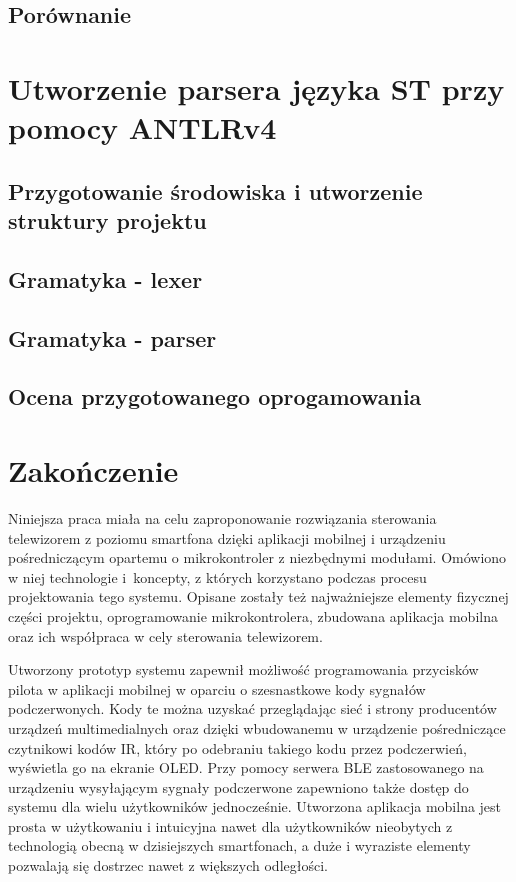 \documentclass[12pt,twoside]{article}
\begin{document}
\subsection{Porównanie}
\clearpage
\section{Utworzenie parsera języka ST przy pomocy ANTLRv4}
\subsection{Przygotowanie środowiska i utworzenie struktury projektu}
\subsection{Gramatyka - lexer}
\subsection{Gramatyka - parser}
\subsection{Ocena przygotowanego oprogamowania}
\clearpage

\section{Zakończenie}

Niniejsza praca miała na celu zaproponowanie rozwiązania sterowania telewizorem z poziomu smartfona dzięki aplikacji mobilnej i urządzeniu pośredniczącym opartemu o mikrokontroler z niezbędnymi modułami. Omówiono w niej technologie i~koncepty, z których korzystano podczas procesu projektowania tego systemu. Opisane zostały też najważniejsze elementy fizycznej części projektu, oprogramowanie mikrokontrolera, zbudowana aplikacja mobilna oraz ich współpraca w cely sterowania telewizorem.

Utworzony prototyp systemu zapewnił możliwość programowania przycisków pilota w aplikacji mobilnej w oparciu o szesnastkowe kody sygnałów podczerwonych. Kody te można uzyskać przeglądając sieć i strony producentów urządzeń multimedialnych oraz dzięki wbudowanemu w urządzenie pośredniczące czytnikowi kodów IR, który po odebraniu takiego kodu przez podczerwień, wyświetla go na ekranie OLED. Przy pomocy serwera BLE zastosowanego na urządzeniu wysyłającym sygnały podczerwone zapewniono także dostęp do systemu dla wielu użytkowników jednocześnie. Utworzona aplikacja mobilna jest prosta w użytkowaniu i intuicyjna nawet dla użytkowników nieobytych z technologią obecną w dzisiejszych smartfonach, a duże i wyraziste elementy pozwalają się dostrzec nawet z większych odległości.
\end{document}
